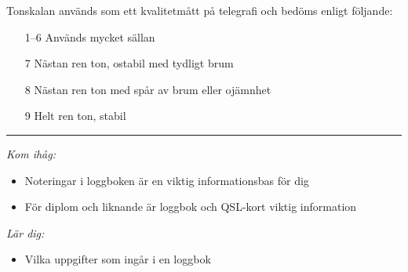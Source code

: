 Tonskalan används som ett kvalitetmått på telegrafi och bedöms enligt följande:

\begin{itemize}
	\item [1--6] Används mycket sällan
	\item [7] Nästan ren ton, ostabil med tydligt brum
	\item [8] Nästan ren ton med spår av brum eller ojämnhet
	\item [9] Helt ren ton, stabil
\end{itemize}

\vspace{1em} \hrule \vspace{1em}

\emph{Kom ihåg:}

\begin{itemize}
	\item Noteringar i loggboken är en viktig informationsbas för dig
	\item För diplom och liknande är loggbok och QSL-kort viktig information
\end{itemize}

\emph{Lär dig:}

\begin{itemize}
	\item Vilka uppgifter som ingår i en loggbok
\end{itemize}